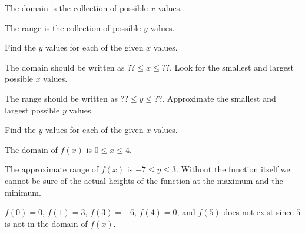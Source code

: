 \begin{smallhint}
    \ba
        \item The domain is the collection of possible $x$ values.
        \item The range is the collection of possible $y$ values.
        \item Find the $y$ values for each of the given $x$ values.
    \ea
\end{smallhint}
\begin{bighint}
    \ba
        \item The domain should be written as $?? \le x \le ??$.  Look for the smallest
            and largest possible $x$ values.
        \item The range should be written as $?? \le y \le ??$.  Approximate the smallest
            and largest possible $y$ values.
        \item Find the $y$ values for each of the given $x$ values.
    \ea
\end{bighint}
\begin{activitySolution}
   \ba
        \item The domain of $f(x)$ is $0 \le x \le 4$.
        \item The approximate range of $f(x)$ is $-7 \le y \le 3$.  Without the function
            itself we cannot be sure of the actual heights of the function at the maximum
            and the minimum.
        \item $f(0) = 0$, $f(1) = 3$, $f(3) = -6$, $f(4) = 0$, and $f(5)$ does not exist
            since $5$ is not in the domain of $f(x)$.
   \ea
\end{activitySolution}
\aftera
